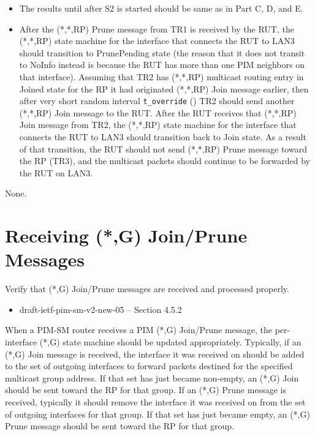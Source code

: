 \documentclass[11pt]{report}
\begin{document}

\begin{itemize}

  \item The results until after S2 is started should be same as in
  Part C, D, and E.

  \item After the (*,*,RP) Prune message from TR1 is received by the RUT,
  the (*,*,RP) state machine for the interface that connects the RUT to
  LAN3 should transition to PrunePending state (the reason that it does
  not transit to NoInfo instead is because the RUT has more than one PIM
  neighbors on that interface).
  Assuming that TR2 has (*,*,RP) multicast routing entry in Joined state
  for the RP it had originated (*,*,RP) Join message earlier, then after
  very short random interval \verb=t_override= ({\PimsmTOverride}) TR2
  should send another (*,*,RP) Join message to the RUT.
  After the RUT receives that (*,*,RP) Join message from TR2,
  the (*,*,RP) state machine for the interface that connects the RUT to
  LAN3 should transition back to Join state.
  As a result of that transition, the RUT should not send (*,*,RP) Prune
  message toward the RP (TR3), and the multicast packets should continue
  to be forwarded by the RUT on LAN3.

\end{itemize}

None.

\newpage
\section{Receiving (*,G) Join/Prune Messages}

Verify that (*,G) Join/Prune messages are received and processed
properly.

\begin{itemize}
  \item draft-ietf-pim-sm-v2-new-05 -- Section 4.5.2
\end{itemize}

When a PIM-SM router receives a PIM (*,G) Join/Prune message, the
per-interface (*,G) state machine should be updated appropriately.
Typically, if an (*,G) Join message is received, the interface it was
received on should be added to the set of outgoing interfaces to
forward packets destined for the specified multicast group address.
If that set has just became non-empty, an (*,G) Join should be sent
toward the RP for that group.
If an (*,G) Prune message is received, typically it should remove
the interface it was received on from the set of outgoing interfaces
for that group. If
that set has just became empty, an (*,G) Prune message should be
sent toward the RP for that group.
\end{document}
